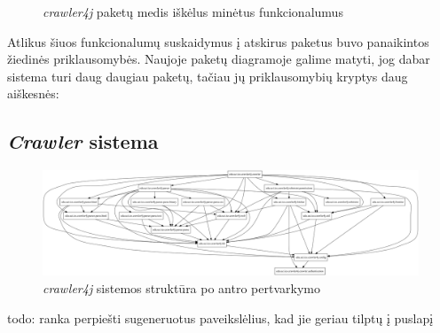 \begin{figure}[H]
    \snugshade
    \endsnugshade
    \caption{\textit{crawler4j} paketų medis iškėlus minėtus funkcionalumus}
\end{figure}

Atlikus šiuos funkcionalumų suskaidymus į atskirus paketus buvo panaikintos žiedinės priklausomybės.
Naujoje paketų diagramoje galime matyti, jog dabar sistema turi daug daugiau paketų, tačiau jų priklausomybių kryptys daug aiškesnės:
\subsection{\textit{Crawler} sistema}
\begin{figure}[H]
    \centering
    \includegraphics[scale=0.2]{img/crawler_packages_v2}
    \caption{\textit{crawler4j} sistemos struktūra po antro pertvarkymo}
    \label{img:crawler_packages_v2}
\end{figure}
todo: ranka perpiešti sugeneruotus paveikslėlius, kad jie geriau tilptų į puslapį


